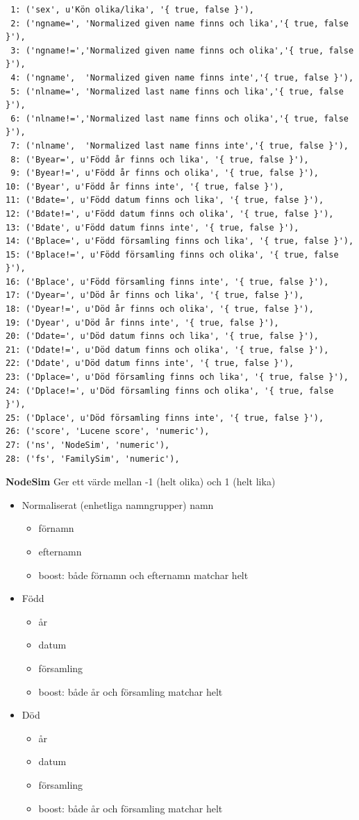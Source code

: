 \documentclass[swedish,11pt]{article}
\begin{document}
\begin{verbatim}
 1: ('sex', u'Kön olika/lika', '{ true, false }'),
 2: ('ngname=', 'Normalized given name finns och lika','{ true, false }'),
 3: ('ngname!=','Normalized given name finns och olika','{ true, false }'),
 4: ('ngname',  'Normalized given name finns inte','{ true, false }'),
 5: ('nlname=', 'Normalized last name finns och lika','{ true, false }'),
 6: ('nlname!=','Normalized last name finns och olika','{ true, false }'),
 7: ('nlname',  'Normalized last name finns inte','{ true, false }'),
 8: ('Byear=', u'Född år finns och lika', '{ true, false }'),
 9: ('Byear!=', u'Född år finns och olika', '{ true, false }'),
10: ('Byear', u'Född år finns inte', '{ true, false }'),
11: ('Bdate=', u'Född datum finns och lika', '{ true, false }'),
12: ('Bdate!=', u'Född datum finns och olika', '{ true, false }'),
13: ('Bdate', u'Född datum finns inte', '{ true, false }'),
14: ('Bplace=', u'Född församling finns och lika', '{ true, false }'),
15: ('Bplace!=', u'Född församling finns och olika', '{ true, false }'),
16: ('Bplace', u'Född församling finns inte', '{ true, false }'),
17: ('Dyear=', u'Död år finns och lika', '{ true, false }'),
18: ('Dyear!=', u'Död år finns och olika', '{ true, false }'),
19: ('Dyear', u'Död år finns inte', '{ true, false }'),
20: ('Ddate=', u'Död datum finns och lika', '{ true, false }'),
21: ('Ddate!=', u'Död datum finns och olika', '{ true, false }'),
22: ('Ddate', u'Död datum finns inte', '{ true, false }'),
23: ('Dplace=', u'Död församling finns och lika', '{ true, false }'),
24: ('Dplace!=', u'Död församling finns och olika', '{ true, false }'),
25: ('Dplace', u'Död församling finns inte', '{ true, false }'),
26: ('score', 'Lucene score', 'numeric'),
27: ('ns', 'NodeSim', 'numeric'),
28: ('fs', 'FamilySim', 'numeric'),
\end{verbatim}

{\bf NodeSim} Ger ett värde mellan -1 (helt olika) och 1 (helt lika)\\
\begin{itemize}
\item Normaliserat (enhetliga namngrupper) namn
\begin{itemize}
\item förnamn
\item efternamn
\item boost: både förnamn och efternamn matchar helt
\end{itemize}
\item Född
\begin{itemize}
\item år
\item datum
\item församling
\item boost: både år och församling matchar helt
\end{itemize}
\item Död
\begin{itemize}
\item år
\item datum
\item församling
\item boost: både år och församling matchar helt
\end{itemize}
\end{itemize}
\end{document}
